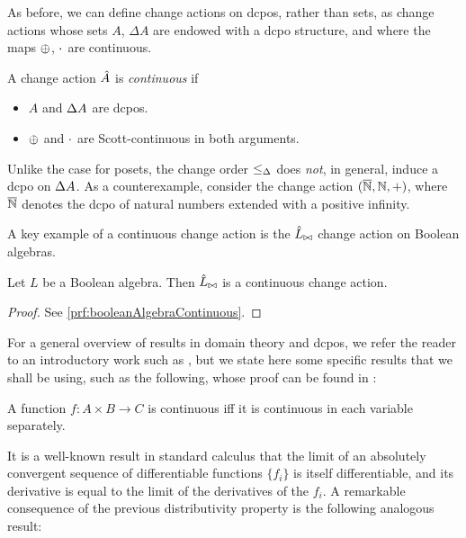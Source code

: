 As before, we can define change actions on dcpos, rather than sets, as change
actions whose sets $A$, $\Delta A$ are endowed with a dcpo structure, and where
the maps $\oplus$, $\cdot$ are continuous.

\begin{defn}
  A change action $\hat{A}$ is \emph{continuous} if
  \begin{itemize}
    \item $A$ and $\Delta A$ are dcpos.
    \item $\oplus$ and $\cdot$ are Scott-continuous in both arguments.
  \end{itemize}
\end{defn}

Unlike the case for posets, the change order $\leq_\Delta$ does \emph{not}, in general,
induce a dcpo on $\Delta A$. As a counterexample, consider 
the change action $(\overline{\mathbb{N}}, \mathbb{N}, +)$, where $\overline{\mathbb{N}}$ denotes the dcpo of natural numbers
extended with a positive infinity.

A key example of a continuous change action is the $\hat{L}_{\bowtie}$ change
action on Boolean algebras.

\begin{prop}[name=Boolean algebra continuity, restate=booleanAlgebraContinuous]
  \label{prop:booleanAlgebraContinuous}
  Let $L$ be a Boolean algebra. Then $\hat{L}_{\bowtie}$ is a continuous
  change action.
\end{prop}
\ifproofs
\begin{proof}
  See \cref{prf:booleanAlgebraContinuous}.
\end{proof}
\fi

For a general overview of results in domain theory and dcpos, we refer the reader to an
introductory work such as \cite{abramsky1994domain}, but we state here some specific results that
we shall be using, such as the following, whose proof can be found in 
\cite[Lemma~3.2.6]{abramsky1994domain}:

\begin{prop}
  \label{prop:distributivityLimit}
  A function $f : A \times B \rightarrow C$ is continuous iff it is continuous in each variable
  separately.
\end{prop}

It is a well-known result in standard calculus that the limit of an absolutely convergent sequence of
differentiable functions $\{f_i\}$ is itself differentiable, and its derivative is equal to the limit
of the derivatives of the $f_i$. A remarkable consequence of the previous distributivity property
is the following analogous result:

